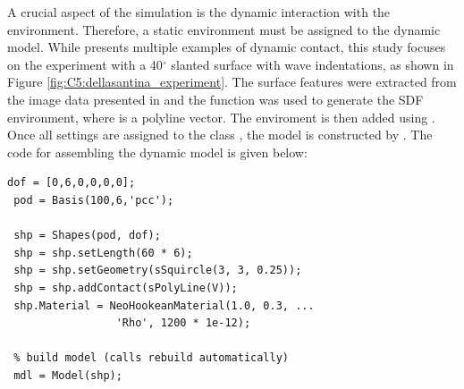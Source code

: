 A crucial aspect of the simulation is the dynamic interaction with the environment. Therefore, a static environment must be assigned to the dynamic model. While \cite{DellaSantina2019Nov} presents multiple examples of dynamic contact, this study focuses on the experiment with a 40$^\circ$ slanted surface with wave indentations, as shown in Figure \ref{fig:C5:dellasantina_experiment}. The surface features were extracted from the image data presented in \cite{DellaSantina2019Nov} and the  function was used to generate the SDF environment, where  is a polyline vector. The enviroment is then added using . Once all settings are assigned to the class , the model is constructed by . The code for assembling the dynamic model is given below:

\begin{lstlisting}[style=matlab]   
 dof = [0,6,0,0,0,0];
 pod = Basis(100,6,'pcc');

 shp = Shapes(pod, dof);
 shp = shp.setLength(60 * 6);
 shp = shp.setGeometry(sSquircle(3, 3, 0.25));
 shp = shp.addContact(sPolyLine(V));
 shp.Material = NeoHookeanMaterial(1.0, 0.3, ... 
                 'Rho', 1200 * 1e-12);

 % build model (calls rebuild automatically)
 mdl = Model(shp);
\end{lstlisting}

